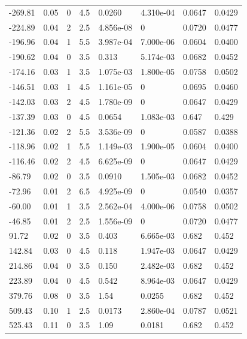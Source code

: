 \documentclass[preview]{standalone}
\begin{document}
{{\begin{tabular}{L{1.2cm}C{1.2cm} C{0.3cm}C{0.5cm} C{1.4cm}C{1.4cm} C{1.4cm}C{1.4cm}}
  -269.81  &  0.05  & 0     & 4.5 &  0.0260  & 4.310e-04  & 0.0647 &  0.0429   \\ 
  -224.89  &  0.04  & 2     & 2.5 &  4.856e-08  & 0  & 0.0720 &  0.0477   \\ 
  -196.96  &  0.04  & 1     & 5.5 &  3.987e-04  & 7.000e-06  & 0.0604 &  0.0400   \\ 
  -190.62  &  0.04  & 0     & 3.5 &  0.313  & 5.174e-03  & 0.0682 &  0.0452   \\ 
  -174.16  &  0.03  & 1     & 3.5 &  1.075e-03  & 1.800e-05  & 0.0758 &  0.0502   \\ 
  -146.51  &  0.03  & 1     & 4.5 &  1.161e-05  & 0  & 0.0695 &  0.0460   \\ 
  -142.03  &  0.03  & 2     & 4.5 &  1.780e-09  & 0  & 0.0647 &  0.0429   \\ 
  -137.39  &  0.03  & 0     & 4.5 &  0.0654  & 1.083e-03  & 0.647 &  0.429   \\ 
  -121.36  &  0.02  & 2     & 5.5 &  3.536e-09  & 0  & 0.0587 &  0.0388   \\ 
  -118.96  &  0.02  & 1     & 5.5 &  1.149e-03  & 1.900e-05  & 0.0604 &  0.0400   \\ 
  -116.46  &  0.02  & 2     & 4.5 &  6.625e-09  & 0  & 0.0647 &  0.0429   \\ 
  -86.79  &  0.02  & 0     & 3.5 &  0.0910  & 1.505e-03  & 0.0682 &  0.0452   \\ 
  -72.96  &  0.01  & 2     & 6.5 &  4.925e-09  & 0  & 0.0540 &  0.0357   \\ 
  -60.00  &  0.01  & 1     & 3.5 &  2.562e-04  & 4.000e-06  & 0.0758 &  0.0502   \\ 
  -46.85  &  0.01  & 2     & 2.5 &  1.556e-09  & 0  & 0.0720 &  0.0477   \\ 
  91.72  &  0.02  & 0     & 3.5 &  0.403  & 6.665e-03  & 0.682 &  0.452   \\ 
  142.84  &  0.03  & 0     & 4.5 &  0.118  & 1.947e-03  & 0.0647 &  0.0429   \\ 
  214.86  &  0.04  & 0     & 3.5 &  0.150  & 2.482e-03  & 0.682 &  0.452   \\ 
  223.89  &  0.04  & 0     & 4.5 &  0.542  & 8.964e-03  & 0.0647 &  0.0429   \\ 
  379.76  &  0.08  & 0     & 3.5 &  1.54  & 0.0255  & 0.682 &  0.452   \\ 
  509.43  &  0.10  & 1     & 2.5 &  0.0173  & 2.860e-04  & 0.0787 &  0.0521   \\ 
  525.43  &  0.11  & 0     & 3.5 &  1.09  & 0.0181  & 0.682 &  0.452   \\ 

\end{tabular}}}
\end{document}
